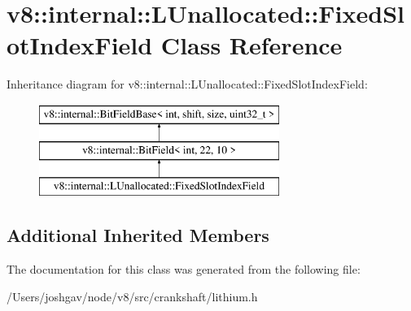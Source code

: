 \hypertarget{classv8_1_1internal_1_1_l_unallocated_1_1_fixed_slot_index_field}{}\section{v8\+:\+:internal\+:\+:L\+Unallocated\+:\+:Fixed\+Slot\+Index\+Field Class Reference}
\label{classv8_1_1internal_1_1_l_unallocated_1_1_fixed_slot_index_field}
Inheritance diagram for v8\+:\+:internal\+:\+:L\+Unallocated\+:\+:Fixed\+Slot\+Index\+Field\+:\begin{figure}[H]
\begin{center}
\leavevmode
\includegraphics[height=3.000000cm]{classv8_1_1internal_1_1_l_unallocated_1_1_fixed_slot_index_field}
\end{center}
\end{figure}
\subsection*{Additional Inherited Members}


The documentation for this class was generated from the following file\+:\begin{DoxyCompactItemize}
\item 
/\+Users/joshgav/node/v8/src/crankshaft/lithium.\+h\end{DoxyCompactItemize}

